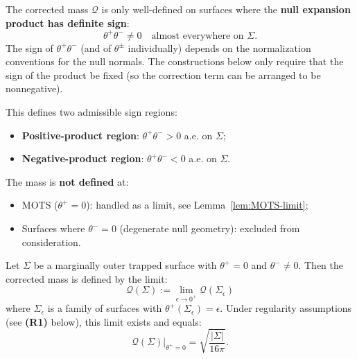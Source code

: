 \begin{remark}
The corrected mass $\mathcal{Q}$ is only well-defined on surfaces where the \textbf{null expansion product has definite sign}:
\begin{equation}
\theta^+\theta^- \neq 0 \quad \text{almost everywhere on } \Sigma.
\end{equation}
The sign of $\theta^+\theta^-$ (and of $\theta^\pm$ individually) depends on the normalization conventions for the null normals. The constructions below only require that the sign of the product be fixed (so the correction term can be arranged to be nonnegative).

This defines two admissible sign regions:
\begin{itemize}
\item \textbf{Positive-product region}: $\theta^+\theta^- > 0$ a.e. on $\Sigma$;
\item \textbf{Negative-product region}: $\theta^+\theta^- < 0$ a.e. on $\Sigma$.
\end{itemize}
The mass is \textbf{not defined} at:
\begin{itemize}
\item MOTS ($\theta^+ = 0$): handled as a limit, see Lemma~\ref{lem:MOTS-limit};
\item Surfaces where $\theta^- = 0$ (degenerate null geometry): excluded from consideration.
\end{itemize}
\end{remark}

\begin{lemma}
\label{lem:MOTS-limit}
Let $\Sigma$ be a marginally outer trapped surface with $\theta^+ = 0$ and $\theta^- \neq 0$. Then the corrected mass is defined by the limit:
\begin{equation}
\mathcal{Q}(\Sigma) := \lim_{\epsilon \to 0^+} \mathcal{Q}(\Sigma_\epsilon)
\end{equation}
where $\Sigma_\epsilon$ is a family of surfaces with $\theta^+(\Sigma_\epsilon) = \epsilon$. Under regularity assumptions (see \textbf{(R1)} below), this limit exists and equals:
\begin{equation}
\mathcal{Q}(\Sigma)|_{\theta^+=0} = \sqrt{\frac{|\Sigma|}{16\pi}}.
\end{equation}
\end{lemma}


